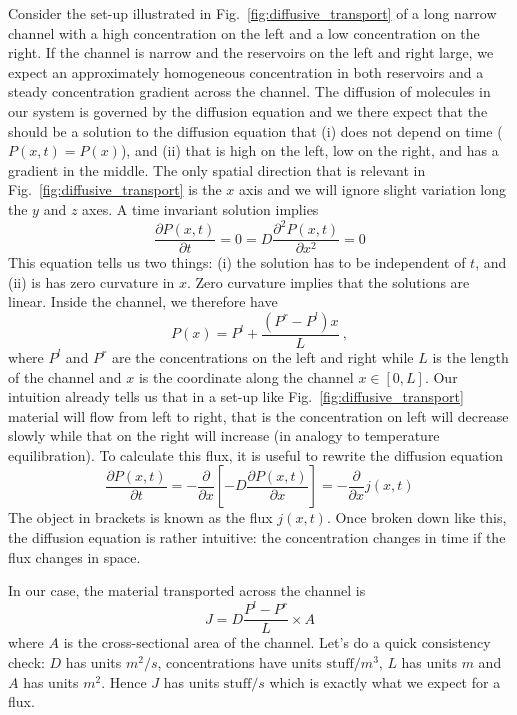 Consider the set-up illustrated in Fig.~\ref{fig:diffusive_transport} of a long narrow channel with a high concentration on the left and a low concentration on the right.
If the channel is narrow and the reservoirs on the left and right large, we expect an approximately homogeneous concentration in both reservoirs and a steady concentration gradient across the channel.
The diffusion of molecules in our system is governed by the diffusion equation and we there expect that the should be a solution to the diffusion equation that (i) does not depend on time ($P(x,t)=P(x)$), and (ii) that is high on the left, low on the right, and has a gradient in the middle.
The only spatial direction that is relevant in Fig.~\ref{fig:diffusive_transport} is the $x$ axis and we will ignore slight variation long the $y$ and $z$ axes.
A time invariant solution implies
\begin{equation}
	\frac{\partial P(x,t)}{\partial t} = 0 = D\frac{\partial^2 P(x,t)}{\partial x^2} = 0
\end{equation}
This equation tells us two things: (i) the solution has to be independent of $t$, and (ii) is has zero curvature in $x$.
Zero curvature implies that the solutions are linear.
Inside the channel, we therefore have
\begin{equation}
 	P(x) = P^l + \frac{(P^r-P^l)x}{L} \ ,
\end{equation}
where $P^l$ and $P^{r}$ are the concentrations on the left and right while $L$ is the length of the channel and $x$ is the coordinate along the channel $x\in [0,L]$.
Our intuition already tells us that in a set-up like Fig.~\ref{fig:diffusive_transport} material will flow from left to right, that is the concentration on left will decrease slowly while that on the right will increase (in analogy to temperature equilibration).
To calculate this flux, it is useful to rewrite the diffusion equation
\begin{equation}
	\frac{\partial P(x,t)}{\partial t} = -\frac{\partial }{\partial x}\left[-D\frac{\partial P(x,t)}{\partial x} \right] = - \frac{\partial }{\partial x} j(x,t)
\end{equation}
The object in brackets is known as the flux $j(x,t)$.
Once broken down like this, the diffusion equation is rather intuitive: the concentration changes in time if the flux changes in space.

In our case, the material transported across the channel is
\begin{equation}
	J = D\frac{P^l - P^r}{L}\times A
\end{equation}
where $A$ is the cross-sectional area of the channel.
Let's do a quick consistency check: $D$ has units $m^2/s$, concentrations have units $\mathrm{stuff}/m^3$, $L$ has units $m$ and $A$ has units $m^2$. Hence $J$ has units $\mathrm{stuff}/s$ which is exactly what we expect for a flux.

